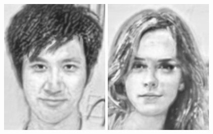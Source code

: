 \documentclass[10pt,twocolumn,letterpaper]{article}
\begin{document}
\begin{figure}[htbp]
{\begin{minipage}[b]{0.22\linewidth}
\includegraphics[width=0.99\linewidth]{img/real_world_photos/bfcn_r2.png}
\includegraphics[width=0.99\linewidth]{img/real_world_photos/bfcn_r3.png}

\end{minipage}}
\end{figure}
\end{document}

